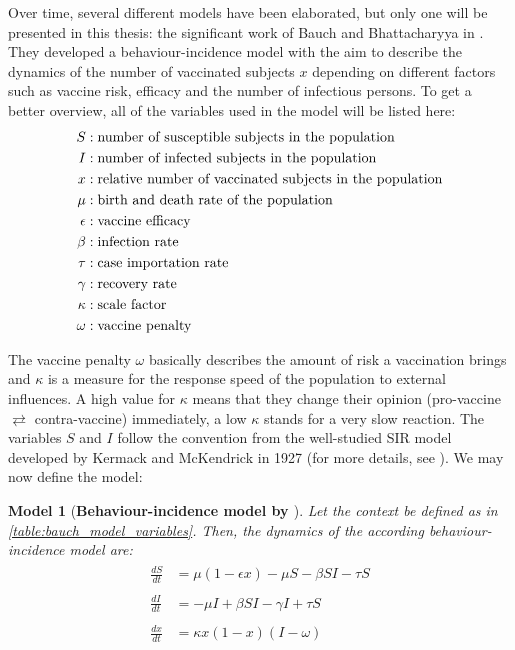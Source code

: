\documentclass[12pt,a4paper,twoside]{article}
\newtheorem{model}{Model}[section]
\begin{document}
Over time, several different models have been elaborated, but only one will be presented in this thesis: the significant work of Bauch and Bhattacharyya in \cite{Bauch2012}. They developed a behaviour-incidence model with the aim to describe the dynamics of the number of vaccinated subjects $x$ depending on different factors such as vaccine risk, efficacy and the number of infectious persons. To get a better overview, all of the variables used in the model will be listed here:
\begin{align}\label{table:bauch_model_variables}
\begin{split}
S &: \textnormal{number of susceptible subjects in the population}\\
I &: \textnormal{number of infected subjects in the population}\\
x &: \textnormal{relative number of vaccinated subjects in the population}\\
\mu &: \textnormal{birth and death rate of the population}\\
\epsilon &: \textnormal{vaccine efficacy}\\
\beta &: \textnormal{infection rate}\\
\tau &: \textnormal{case importation rate}\\
\gamma &: \textnormal{recovery rate}\\
\kappa &: \textnormal{scale factor}\\
\omega &: \textnormal{vaccine penalty}
\end{split}
\end{align}

The vaccine penalty $\omega$ basically describes the amount of risk a vaccination brings and $\kappa$ is a measure for the response speed of the population to external influences. A high value for $\kappa$ means that they change their opinion (pro-vaccine $\rightleftarrows$ contra-vaccine) immediately, a low $\kappa$ stands for a very slow reaction. The variables $S$ and $I$ follow the convention from the well-studied \ac{SIR} model developed by Kermack and McKendrick in 1927 (for more details, see \cite{Muller2015}). We may now define the model:
\begin{model}[\textbf{Behaviour-incidence model by \cite{Bauch2012}}]\label{model:bauch}
	Let the context be defined as in \eqref{table:bauch_model_variables}. Then, the dynamics of the according behaviour-incidence model are:
	\begin{align}
	\begin{split}
	\frac{dS}{dt} &= \mu\left(1-\epsilon x\right) - \mu S - \beta SI - \tau S\\
	&\\
	\frac{dI}{dt} &= -\mu I + \beta SI - \gamma I + \tau S\\
	&\\
	\frac{dx}{dt} &= \kappa x\left(1 - x\right)\left(I - \omega\right)
	\end{split}
	\end{align}
\end{model}
\end{document}
